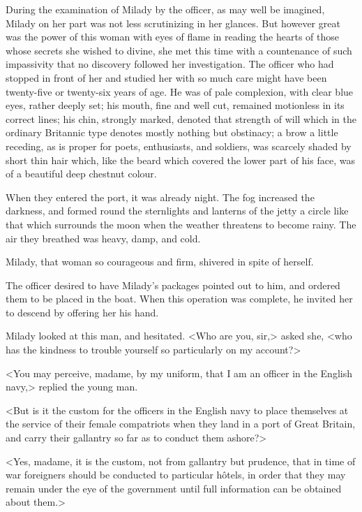 During the examination of Milady by the officer, as may well be imagined, Milady on her part was not less scrutinizing in her glances. But however great was the power of this woman with eyes of flame in reading the hearts of those whose secrets she wished to divine, she met this time with a countenance of such impassivity that no discovery followed her investigation. The officer who had stopped in front of her and studied her with so much care might have been twenty-five or twenty-six years of age. He was of pale complexion, with clear blue eyes, rather deeply set; his mouth, fine and well cut, remained motionless in its correct lines; his chin, strongly marked, denoted that strength of will which in the ordinary Britannic type denotes mostly nothing but obstinacy; a brow a little receding, as is proper for poets, enthusiasts, and soldiers, was scarcely shaded by short thin hair which, like the beard which covered the lower part of his face, was of a beautiful deep chestnut colour. 

When they entered the port, it was already night. The fog increased the darkness, and formed round the sternlights and lanterns of the jetty a circle like that which surrounds the moon when the weather threatens to become rainy. The air they breathed was heavy, damp, and cold. 

Milady, that woman so courageous and firm, shivered in spite of herself. 

The officer desired to have Milady's packages pointed out to him, and ordered them to be placed in the boat. When this operation was complete, he invited her to descend by offering her his hand. 

Milady looked at this man, and hesitated. <Who are you, sir,> asked she, <who has the kindness to trouble yourself so particularly on my account?> 

<You may perceive, madame, by my uniform, that I am an officer in the English navy,> replied the young man. 

<But is it the custom for the officers in the English navy to place themselves at the service of their female compatriots when they land in a port of Great Britain, and carry their gallantry so far as to conduct them ashore?> 

<Yes, madame, it is the custom, not from gallantry but prudence, that in time of war foreigners should be conducted to particular hôtels, in order that they may remain under the eye of the government until full information can be obtained about them.> 

